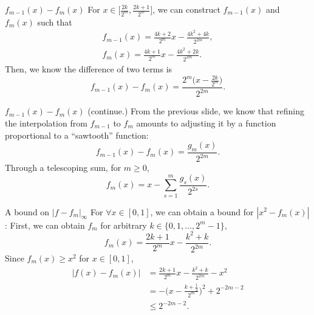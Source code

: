 \documentclass{if-beamer}
\begin{document}
\begin{frame}{$f_{m-1}(x)-f_{m}(x)$}
For $x\in\big[\frac{2k}{2^{m}},\frac{2k+1}{2^{m}}\big]$, 
we can construct $f_{m-1}(x)$ and $f_{m}(x)$ such that
\begin{align*}
    f_{m-1}(x) = \frac{4k+2}{2^{m}}x-\frac{4k^{2}+4k}{2^{2m}}, \\
    f_{m}(x) = \frac{4k+1}{2^{m}}x-\frac{4k^{2}+2k}{2^{2m}}. 
\end{align*}
Then, we know the difference of two terms is 
\begin{equation*}
    f_{m-1}(x)-f_{m}(x) =\frac{2^{m}\big(x-\frac{2k}{2^m}\big)}{2^{2m}}.
\end{equation*}
\end{frame}

\begin{frame}{$f_{m-1}(x)-f_{m}(x)$ (continue.) }
From the previous slide, we know that refining the interpolation from $f_{m-1}$ to $f_{m}$ amounts to adjusting it by a function proportional to a ``sawtooth'' function:
\begin{equation*}
    f_{m-1}(x)-f_{m}(x) = \frac{g_{m}(x)}{2^{2m}}.
\end{equation*}
Through a telescoping sum, for $m\geq 0$,
\begin{equation*}
    f_{m}(x) = x-\sum_{s=1}^{m}\frac{g_{s}(x)}{2^{2s}}.
\end{equation*}
\end{frame}

\begin{frame}{A bound on $\left| f - f_{m} \right|_{\infty}$}
For $\forall x \in [0,1]$, we can obtain a bound for $|x^{2}-f_m(x)|$:
First, we can obtain $f_{m}$ for arbitrary $k\in\{0,1,\dots,2^{m}-1\}$,
\begin{equation*}
    f_{m}(x)=\frac{2k+1}{2^{m}}x-\frac{k^{2}+k}{2^{2m}}.
\end{equation*}
Since $f_m(x)\geq x^{2}$ for $x\in [0,1]$, 
\begin{align*}
    \left| f(x) - f_{m}(x) \right| &= \frac{2k+1}{2^{m}}x-\frac{k^{2}+k}{2^{2m}}-x^{2} \\
    &= -\bigg( x - \frac{k+\frac{1}{2}}{2^{m}} \bigg)^{2} + 2^{-2m-2} \\
    &\leq 2^{-2m-2}.
\end{align*}
\end{frame}
\end{document}
